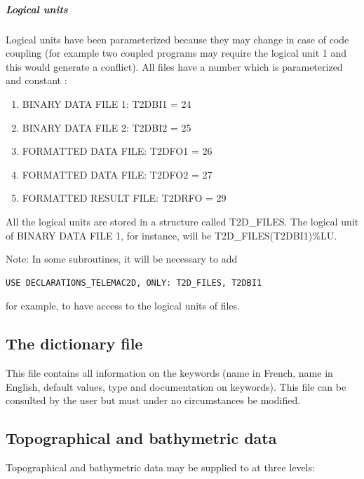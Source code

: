 \subparagraph{ Logical units}

 Logical units have been parameterized because they may change in case of code coupling (for example two coupled programs may require the logical unit 1 and this would generate a conflict). All files have a number which is parameterized and constant :

\begin{enumerate}
\item  BINARY DATA FILE 1: T2DBI1 = 24

\item  BINARY DATA FILE 2: T2DBI2 = 25

\item  FORMATTED DATA FILE: T2DFO1 = 26

\item  FORMATTED DATA FILE: T2DFO2 = 27

\item  FORMATTED RESULT FILE: T2DRFO = 29
\end{enumerate}

 All the logical units are stored in a structure called T2D\_FILES. The logical unit of BINARY DATA FILE 1, for instance, will be T2D\_FILES(T2DBI1)\%LU.

\begin{WarningBlock}{Note:}
 In some subroutines, it will be necessary to add
\begin{lstlisting}[language=TelFortran]
  USE DECLARATIONS_TELEMAC2D, ONLY: T2D_FILES, T2DBI1
\end{lstlisting}
 for example, to have access to the logical units of files.
\end{WarningBlock}

\subsection{ The dictionary file}

 This file contains all information on the keywords (name in French, name in English, default values, type and documentation on keywords). This file can be consulted by the user but must under no circumstances be modified.


\subsection{ Topographical and bathymetric data}
\label{subs:topo:bathy:data}
 Topographical and bathymetric data may be supplied to  at three levels:

